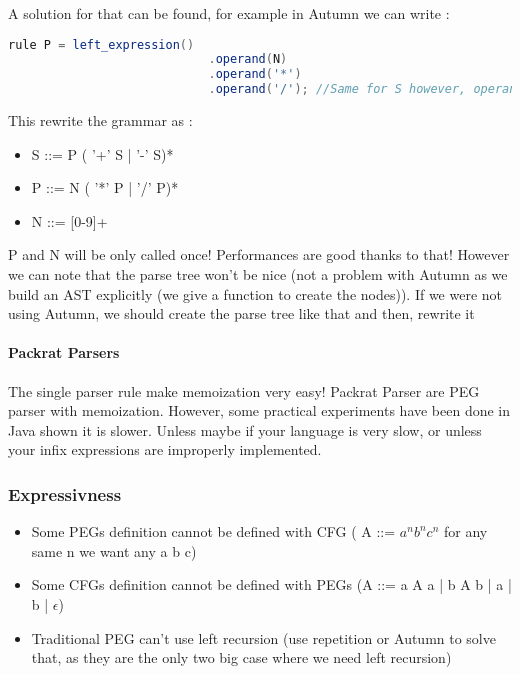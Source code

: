            A solution for that can be found, for example in Autumn we can write : 
            \begin{lstlisting}[language=Java]
                rule P = left_expression()
                            .operand(N)
                            .operand('*')
                            .operand('/'); //Same for S however, operand is P in S, for precedence
            \end{lstlisting}
            This rewrite the grammar as : 
            \begin{itemize}
                \item S ::= P ( '+' S | '-' S)*
                \item P ::= N ( '*' P | '/' P)*
                \item N ::= [0-9]+
            \end{itemize}
            P and N will be only called once! Performances are good thanks to
            that! However we can note that the parse tree won't be nice (not a
            problem with Autumn as we build an AST explicitly (we give a
            function to create the nodes)). If we were not using Autumn, we
            should create the parse tree like that and then, rewrite it

            \paragraph{Packrat Parsers}
                The single parser rule make memoization very easy! Packrat
                Parser are PEG parser with memoization. However, some practical
                experiments have been done in Java shown it is slower. Unless
                maybe if your language is very slow, or unless your infix
                expressions are improperly implemented.
        \subsubsection{Expressivness}
            \begin{itemize}
                \item Some PEGs definition cannot be defined with CFG ( A ::=
                $a^n b^n c^n$ for any same n we want any a b c)
                \item Some CFGs definition cannot be defined with PEGs (A ::= a
                A a | b A b | a | b | $\epsilon$)
                \item Traditional PEG can't use left recursion (use repetition
                or Autumn to solve that, as they are the only two big case where
                we need left recursion)
            \end{itemize}

